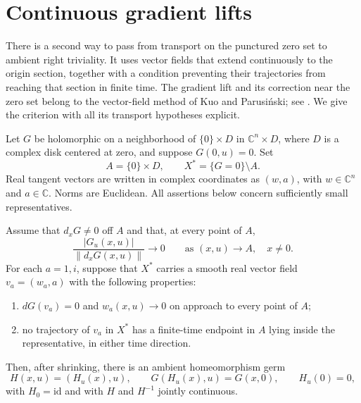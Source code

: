 \section{Continuous gradient lifts}
\label{sec:continuous-gradient}

There is a second way to pass from transport on the punctured zero set
to ambient right triviality.  It uses vector fields that extend
continuously to the origin section, together with a condition preventing
their trajectories from reaching that section in finite time.  The
gradient lift and its correction near the zero set belong to the
vector-field method of Kuo and Parusi\'nski; see
\cite[Section~2, especially equation~(2.5)]{Parusinski1999}.
We give the criterion with all its transport hypotheses explicit.

Let $G$ be holomorphic on a neighborhood of $\{0\}\times D$ in
$\mathbb C^n\times D$, where $D$ is a complex disk centered at zero,
and suppose $G(0,u)=0$.  Set
\[
 A=\{0\}\times D,\qquad X^*=\{G=0\}\setminus A.
\]
Real tangent vectors are written in complex coordinates as $(w,a)$,
with $w\in\mathbb C^n$ and $a\in\mathbb C$.  Norms are Euclidean.
All assertions below concern sufficiently small representatives.

\begin{proposition}
\label{prop:continuous-gradient-lift}
Assume that $d_xG\ne0$ off $A$ and that, at every point of $A$,
\begin{equation}
\label{eq:gradient-small-o}
 \frac{|G_u(x,u)|}{\|d_xG(x,u)\|}\longrightarrow0
 \qquad\text{as }(x,u)\longrightarrow A,\quad x\ne0.
\end{equation}
For each $a=1,i$, suppose that $X^*$ carries a smooth real vector field
$v_a=(w_a,a)$ with the following properties:
\begin{enumerate}
\item $dG(v_a)=0$ and $w_a(x,u)\to0$ on approach to every point of $A$;
\item no trajectory of $v_a$ in $X^*$ has a finite-time endpoint in
      $A$ lying inside the representative, in either time direction.
\end{enumerate}
Then, after shrinking, there is an ambient homeomorphism germ
\[
 H(x,u)=(H_u(x),u),\qquad
 G(H_u(x),u)=G(x,0),\qquad H_u(0)=0,
\]
with $H_0=\mathrm{id}$ and with $H$ and $H^{-1}$ jointly continuous.
\end{proposition}

